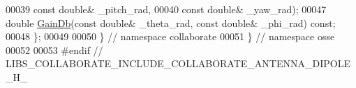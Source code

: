 \begin{DoxyCode}
00039                 \textcolor{keyword}{const} \textcolor{keywordtype}{double}& \_pitch\_rad,
00040                 \textcolor{keyword}{const} \textcolor{keywordtype}{double}& \_yaw\_rad);
00047   \textcolor{keywordtype}{double} \hyperlink{classosse_1_1collaborate_1_1_antenna_dipole_a46aab376eb3bb44ae47beceef79db8df}{GainDb}(\textcolor{keyword}{const} \textcolor{keywordtype}{double}& \_theta\_rad, \textcolor{keyword}{const} \textcolor{keywordtype}{double}& \_phi\_rad) \textcolor{keyword}{const};
00048 \};
00049 
00050 \}  \textcolor{comment}{// namespace collaborate}
00051 \}  \textcolor{comment}{// namespace osse}
00052 
00053 \textcolor{preprocessor}{#endif  // LIBS\_COLLABORATE\_INCLUDE\_COLLABORATE\_ANTENNA\_DIPOLE\_H\_}
\end{DoxyCode}
